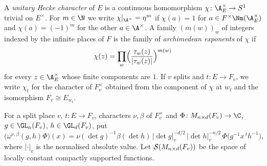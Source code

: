 \begin{definition}\label{pf:tlift:chars}
A \emph{unitary Hecke character} of $E$ is a continuous homomorphism $\chi\colon\tliftAE^\times\to S^1$
trivial on $E^\times$. For $m\in\N$ we write $\chi|_{\A^\times}=\eta^m$ if $\chi(a)=1$ for
$a\in F^\times\Nm(\tliftAE^\times)$ and $\chi(a)=(-1)^m$ for the other $a\in\A^\times$. A family
$(m(w))_w$ of integers indexed by the infinite places of $F$ is the family of \emph{archimedean exponents}
of $\chi$ if
\[
  \chi(z)=\prod_w\Bigl(\frac{\tau_w(z)}{|\tau_w(z)|}\Bigr)^{m(w)}
\]
for every $z\in\tliftAE^\times$ whose finite components are $1$. If $v$ splits and $t\colon E\to F_v$, we
write $\chi_t$ for the character of $F_v^\times$ obtained from the component of $\chi$ at $w_t$ and the
isomorphism $F_v\cong E_{w_t}$.
\end{definition}

For a split place $v$, $t\colon E\to F_v$, characters $\nu,\beta$ of $F_v^\times$ and
$\Phi\colon M_{n\times d}(F_v)\to\C$, $g\in\GL_n(F_v)$, $h\in\GL_d(F_v)$, put
\begin{equation}\label{eq:tlift:omA}
  \bigl(\omega^{\nu,\beta}(g,h)\Phi\bigr)(x)=\nu(\det g)^{-1}\beta(\det h)\,|\det g|_v^{-d/2}\,
  |\det h|_v^{-n/2}\,\Phi\bigl(g^{-1}x\,{}^th^{-1}\bigr),
\end{equation}
where $|\cdot|_v$ is the normalised absolute value. Let
$\mathcal{S}(M_{n\times d}(F_v))$ be the space of locally constant compactly supported functions.

